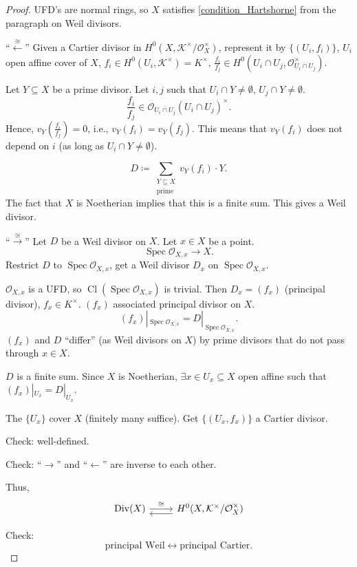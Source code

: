 \documentclass[12pt]{article}
\DeclareMathOperator{\Spec}{Spec}
\DeclareMathOperator{\Div}{Div}
\DeclareMathOperator{\Cl}{Cl}
\theoremstyle{definition}
\theoremstyle{remark}
\begin{document}
\begin{proof}
UFD's are normal rings, so $X$ satisfies \eqref{condition_Hartshorne} from the paragraph on Weil divisors.

``$\xleftarrow{\cong}$'' Given a Cartier divisor in $H^0(X,\mathcal{K}^{\times}/\mathcal{O}_X^{\times})$, represent it by $\{(U_i,f_i)\}$, $U_i$ open affine cover of $X$, $f_i\in H^0(U_i,\mathcal{K}^{\times})=K^{\times}$, $\frac{f_i}{f_j}\in H^0(U_i\cap U_j,\mathcal{O}_{U_i\cap U_j}^{\times})$.

Let $Y\subseteq X$ be a prime divisor. Let $i,j$ such that $U_i\cap Y\neq\emptyset$, $U_j\cap Y\neq\emptyset$.
\[\frac{f_i}{f_j}\in\mathcal{O}_{U_i\cap U_j}(U_i\cap U_j)^{\times}.\]
Hence, $v_Y(\frac{f_i}{f_j})=0$, i.e., $v_Y(f_i)=v_Y(f_j)$. This means that $v_Y(f_i)$ does not depend on $i$ (as long as $U_i\cap Y\neq\emptyset$).

\[D\coloneqq\sum_{\substack{Y\subseteq X\\\text{prime}}}v_Y(f_i)\cdot Y.\]
The fact that $X$ is Noetherian implies that this is a finite sum. This gives a Weil divisor.

``$\xrightarrow{\cong}$'' Let $D$ be a Weil divisor on $X$. Let $x\in X$ be a point.
\[\Spec\mathcal{O}_{X,x}\longrightarrow X.\]
Restrict $D$ to $\Spec\mathcal{O}_{X,x}$, get a Weil divisor $D_x$ on $\Spec\mathcal{O}_{X,x}$.

$\mathcal{O}_{X,x}$ is a UFD, so $\Cl(\Spec\mathcal{O}_{X,x})$ is trivial. Then $D_x=(f_x)$ (principal divisor), $f_x\in K^{\times}$. $(f_x)$ associated principal divisor on $X$.
\[(f_x)|_{\Spec\mathcal{O}_{X,x}}=D|_{\Spec\mathcal{O}_{X,x}}.\]
$(f_x)$ and $D$ ``differ'' (as Weil divisors on $X$) by prime divisors that do not pass through $x\in X$.

$D$ is a finite sum. Since $X$ is Noetherian, $\exists x\in U_x\subseteq X$ open affine such that $(f_x)|_{U_x}=D|_{U_x}$.

The $\{U_x\}$ cover $X$ (finitely many suffice). Get $\{(U_x,f_x)\}$ a Cartier divisor.

Check: well-defined.

Check: ``$\rightarrow$'' and ``$\leftarrow$'' are inverse to each other.

Thus,
\[
\begin{tikzcd}
\Div(X)\arrow[r,"\cong"]&H^0(X,\mathcal{K}^{\times}/\mathcal{O}_X^{\times})\arrow[l,shift left, shift left]
\end{tikzcd}
\]

Check:
\[\text{principal Weil}\longleftrightarrow\text{principal Cartier}.\]
\end{proof}
\end{document}
